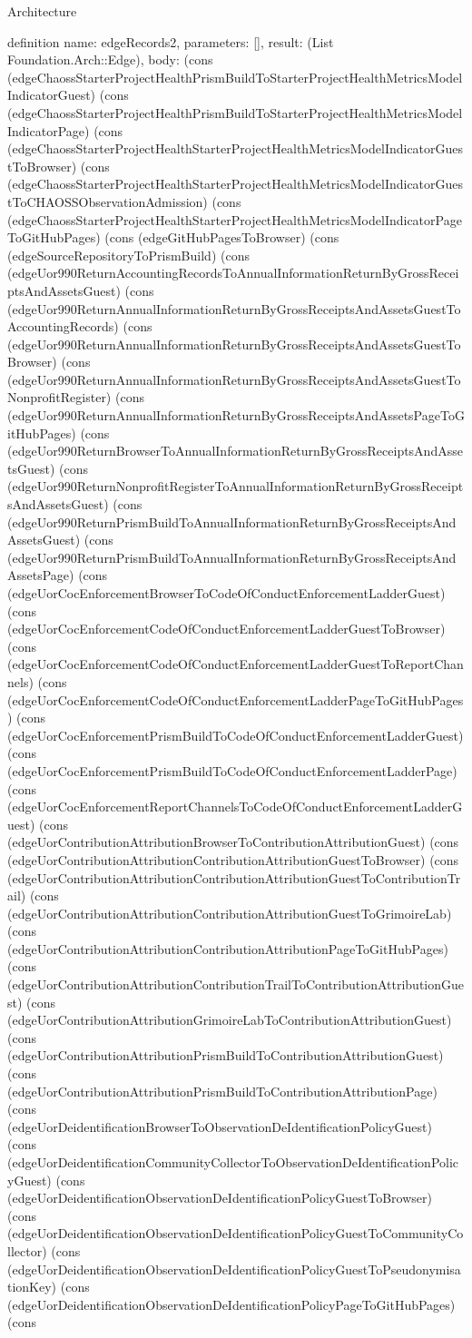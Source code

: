 \begin{lexlean}{Architecture}
\begin{semanticmodule}
definition{
  name: edgeRecords2,
  parameters: [],
  result: (List Foundation.Arch::Edge),
  body: (cons (edgeChaossStarterProjectHealthPrismBuildToStarterProjectHealthMetricsModelIndicatorGuest) (cons (edgeChaossStarterProjectHealthPrismBuildToStarterProjectHealthMetricsModelIndicatorPage) (cons (edgeChaossStarterProjectHealthStarterProjectHealthMetricsModelIndicatorGuestToBrowser) (cons (edgeChaossStarterProjectHealthStarterProjectHealthMetricsModelIndicatorGuestToCHAOSSObservationAdmission) (cons (edgeChaossStarterProjectHealthStarterProjectHealthMetricsModelIndicatorPageToGitHubPages) (cons (edgeGitHubPagesToBrowser) (cons (edgeSourceRepositoryToPrismBuild) (cons (edgeUor990ReturnAccountingRecordsToAnnualInformationReturnByGrossReceiptsAndAssetsGuest) (cons (edgeUor990ReturnAnnualInformationReturnByGrossReceiptsAndAssetsGuestToAccountingRecords) (cons (edgeUor990ReturnAnnualInformationReturnByGrossReceiptsAndAssetsGuestToBrowser) (cons (edgeUor990ReturnAnnualInformationReturnByGrossReceiptsAndAssetsGuestToNonprofitRegister) (cons (edgeUor990ReturnAnnualInformationReturnByGrossReceiptsAndAssetsPageToGitHubPages) (cons (edgeUor990ReturnBrowserToAnnualInformationReturnByGrossReceiptsAndAssetsGuest) (cons (edgeUor990ReturnNonprofitRegisterToAnnualInformationReturnByGrossReceiptsAndAssetsGuest) (cons (edgeUor990ReturnPrismBuildToAnnualInformationReturnByGrossReceiptsAndAssetsGuest) (cons (edgeUor990ReturnPrismBuildToAnnualInformationReturnByGrossReceiptsAndAssetsPage) (cons (edgeUorCocEnforcementBrowserToCodeOfConductEnforcementLadderGuest) (cons (edgeUorCocEnforcementCodeOfConductEnforcementLadderGuestToBrowser) (cons (edgeUorCocEnforcementCodeOfConductEnforcementLadderGuestToReportChannels) (cons (edgeUorCocEnforcementCodeOfConductEnforcementLadderPageToGitHubPages) (cons (edgeUorCocEnforcementPrismBuildToCodeOfConductEnforcementLadderGuest) (cons (edgeUorCocEnforcementPrismBuildToCodeOfConductEnforcementLadderPage) (cons (edgeUorCocEnforcementReportChannelsToCodeOfConductEnforcementLadderGuest) (cons (edgeUorContributionAttributionBrowserToContributionAttributionGuest) (cons (edgeUorContributionAttributionContributionAttributionGuestToBrowser) (cons (edgeUorContributionAttributionContributionAttributionGuestToContributionTrail) (cons (edgeUorContributionAttributionContributionAttributionGuestToGrimoireLab) (cons (edgeUorContributionAttributionContributionAttributionPageToGitHubPages) (cons (edgeUorContributionAttributionContributionTrailToContributionAttributionGuest) (cons (edgeUorContributionAttributionGrimoireLabToContributionAttributionGuest) (cons (edgeUorContributionAttributionPrismBuildToContributionAttributionGuest) (cons (edgeUorContributionAttributionPrismBuildToContributionAttributionPage) (cons (edgeUorDeidentificationBrowserToObservationDeIdentificationPolicyGuest) (cons (edgeUorDeidentificationCommunityCollectorToObservationDeIdentificationPolicyGuest) (cons (edgeUorDeidentificationObservationDeIdentificationPolicyGuestToBrowser) (cons (edgeUorDeidentificationObservationDeIdentificationPolicyGuestToCommunityCollector) (cons (edgeUorDeidentificationObservationDeIdentificationPolicyGuestToPseudonymisationKey) (cons (edgeUorDeidentificationObservationDeIdentificationPolicyPageToGitHubPages) (cons }
\end{semanticmodule}
\end{lexlean}

